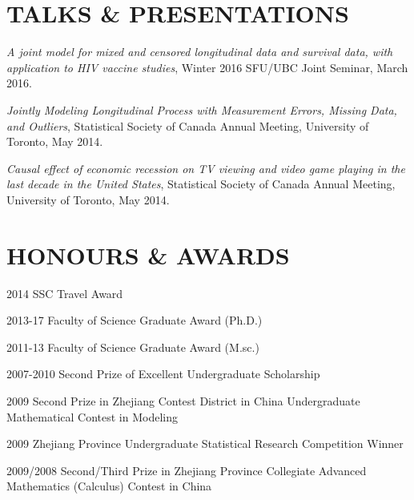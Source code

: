 \documentclass[margin]{res}
\begin{document}
\begin{resume}
\section{TALKS \&  PRESENTATIONS}  

{\it A joint model for mixed and censored longitudinal data and survival data, with application to HIV vaccine studies}, 
Winter 2016 SFU/UBC Joint Seminar, March 2016.

{\it Jointly Modeling Longitudinal Process with Measurement Errors, Missing Data, and Outliers},
Statistical Society of Canada Annual Meeting, University of Toronto, May 2014.

{\it Causal effect of economic recession on TV viewing and video game playing in the last decade in the United States}, Statistical Society of Canada Annual Meeting, University of Toronto, May 2014.



\section{HONOURS \&  AWARDS}
 2014 SSC Travel Award

 2013-17 Faculty of Science Graduate Award (Ph.D.)

 2011-13 Faculty of Science Graduate Award (M.sc.)

 2007-2010 Second Prize of Excellent Undergraduate Scholarship 

 2009 Second Prize in Zhejiang Contest District in China Undergraduate Mathematical Contest in Modeling

 2009 Zhejiang Province Undergraduate Statistical Research Competition Winner

  2009/2008 Second/Third Prize in Zhejiang Province Collegiate Advanced Mathematics (Calculus)
Contest in China


\end{resume}
\end{document}
